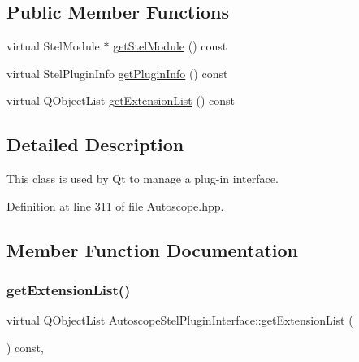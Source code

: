 \subsection*{Public Member Functions}
\begin{DoxyCompactItemize}
\item 
virtual Stel\+Module $\ast$ \mbox{\hyperlink{class_autoscope_stel_plugin_interface_a681456cfd440703d70f3fbf1b5a07887}{get\+Stel\+Module}} () const
\item 
virtual Stel\+Plugin\+Info \mbox{\hyperlink{class_autoscope_stel_plugin_interface_a22c9f313b39683d3ec45523ac5cbc4e7}{get\+Plugin\+Info}} () const
\item 
virtual Q\+Object\+List \mbox{\hyperlink{class_autoscope_stel_plugin_interface_ad9cba957b6ed14aa666e18671881862a}{get\+Extension\+List}} () const
\end{DoxyCompactItemize}


\subsection{Detailed Description}
This class is used by Qt to manage a plug-\/in interface. 

Definition at line 311 of file Autoscope.\+hpp.



\subsection{Member Function Documentation}
\mbox{\label{class_autoscope_stel_plugin_interface_ad9cba957b6ed14aa666e18671881862a}} 
\subsubsection{\texorpdfstring{getExtensionList()}{getExtensionList()}}
{\footnotesize\ttfamily virtual Q\+Object\+List Autoscope\+Stel\+Plugin\+Interface\+::get\+Extension\+List (\begin{DoxyParamCaption}{ }\end{DoxyParamCaption}) const\hspace{0.3cm}{\ttfamily [inline]}, {\ttfamily [virtual]}}




